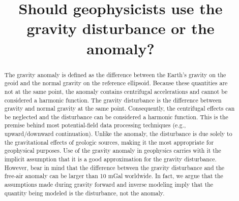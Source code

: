 \documentclass[manuscript]{geophysics}
\begin{document}
\title{Should geophysicists use the gravity disturbance or the anomaly?}

\renewcommand{\thefootnote}{\fnsymbol{footnote}} 




\maketitle

\begin{abstract}
  The gravity anomaly is defined as the difference between the Earth's gravity
 on the geoid and the normal gravity on the reference ellipsoid.
 Because these quantities are not at the same point, the anomaly contains
 centrifugal accelerations and cannot be considered a harmonic function.
 The gravity disturbance is the difference between gravity and normal gravity
 at the same point.
 Consequently, the centrifugal effects can be neglected and the disturbance can
 be considered a harmonic function.
 This is the premise behind most potential-field data processing techniques
 (e.g., upward/downward continuation).
 Unlike the anomaly, the disturbance is due solely to the
 gravitational effects of geologic sources, making it the most appropriate
 for geophysical purposes.
 Use of the gravity anomaly in geophysics carries with it the implicit
 assumption that it is a good approximation for the gravity disturbance.
 However, bear in mind that the difference between the gravity disturbance and
 the free-air anomaly can be larger than 10 mGal worldwide.
 In fact, we argue that the assumptions made during gravity forward and inverse
 modeling imply that the quantity being modeled is the disturbance, not the
 anomaly.
\end{abstract}
\end{document}

